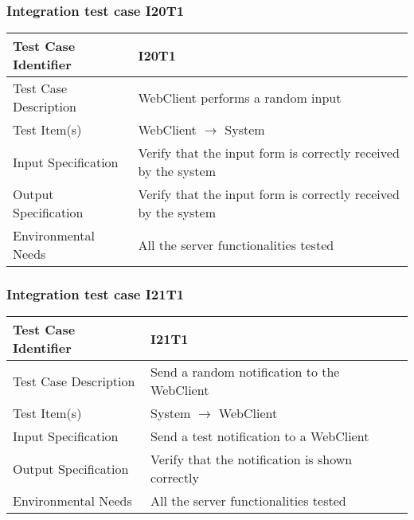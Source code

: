 \subsubsection{Integration test case I20T1}
\begin{center}
  \begin{tabular}{ |l p{10cm}| } \hline
    Test Case Identifier & I20T1 \\ \hline
    Test Case Description & WebClient performs a random input  \\ \hline
    Test Item(s) & WebClient $\rightarrow$ System \\ \hline
    Input Specification & Verify that the input form is correctly received by the system \\ \hline
    Output Specification & Verify that the input form is correctly received by the system \\ \hline
    Environmental Needs & All the server functionalities tested \\ \hline
  \end{tabular}
\end{center}
\subsubsection{Integration test case I21T1}
\begin{center}
  \begin{tabular}{ |l p{10cm}| } \hline
    Test Case Identifier & I21T1 \\ \hline
    Test Case Description & Send a random notification to the WebClient \\ \hline
    Test Item(s) & System $\rightarrow$ WebClient \\ \hline
    Input Specification & Send a test notification to a WebClient \\ \hline
    Output Specification & Verify that the notification is shown correctly \\ \hline
    Environmental Needs & All the server functionalities tested \\ \hline
  \end{tabular}
\end{center}
